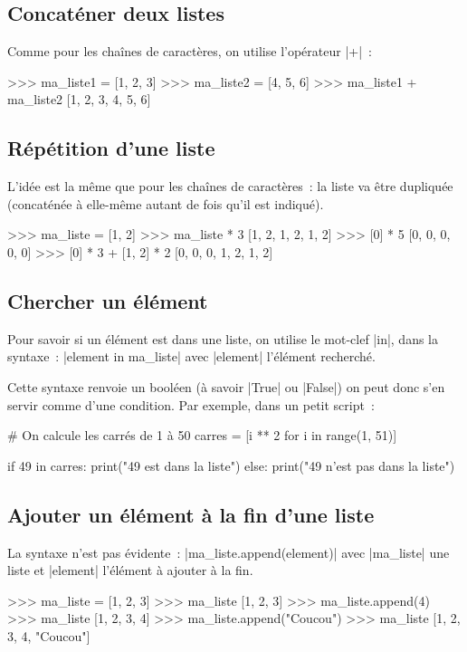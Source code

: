 	\subsection{Concaténer deux listes}
	
		Comme pour les chaînes de caractères, on utilise l'opérateur \python|+|~:
		\begin{pythoncode}
			>>> ma_liste1 = [1, 2, 3]
			>>> ma_liste2 = [4, 5, 6]
			>>> ma_liste1 + ma_liste2
			[1, 2, 3, 4, 5, 6]
		\end{pythoncode}
	
	\subsection{Répétition d'une liste}
		
		L'idée est la même que pour les chaînes de caractères~: la liste va être dupliquée (concaténée à elle-même autant de fois qu'il est indiqué).
		\begin{pythoncode}
			>>> ma_liste = [1, 2]
			>>> ma_liste * 3
			[1, 2, 1, 2, 1, 2]
			>>> [0] * 5
			[0, 0, 0, 0, 0]
			>>> [0] * 3 + [1, 2] * 2
			[0, 0, 0, 1, 2, 1, 2]
		\end{pythoncode}
	
	\subsection{Chercher un élément}
		
		Pour savoir si un élément est dans une liste, on utilise le mot-clef \python|in|, dans la syntaxe~: \python|element in ma_liste| avec \python|element| l'élément recherché.
		
		Cette syntaxe renvoie un booléen (à savoir \python|True| ou \python|False|) on peut donc s'en servir comme d'une condition.
		Par exemple, dans un petit script~:
		
		\begin{pythoncode}
			# On calcule les carrés de 1 à 50
			carres = [i ** 2 for i in range(1, 51)]
			
			if 49 in carres:
				print("49 est dans la liste")
			else:
				print("49 n'est pas dans la liste")
		\end{pythoncode}
			
	\subsection{Ajouter un élément à la fin d'une liste}
		
		La syntaxe n'est pas évidente~: \python|ma_liste.append(element)| avec \python|ma_liste| une liste et \python|element| l'élément à ajouter à la fin.
		\begin{pythoncode}
			>>> ma_liste = [1, 2, 3]
			>>> ma_liste
			[1, 2, 3]
			>>> ma_liste.append(4)
			>>> ma_liste
			[1, 2, 3, 4]
			>>> ma_liste.append("Coucou")
			>>> ma_liste
			[1, 2, 3, 4, "Coucou"]
		\end{pythoncode}
	
